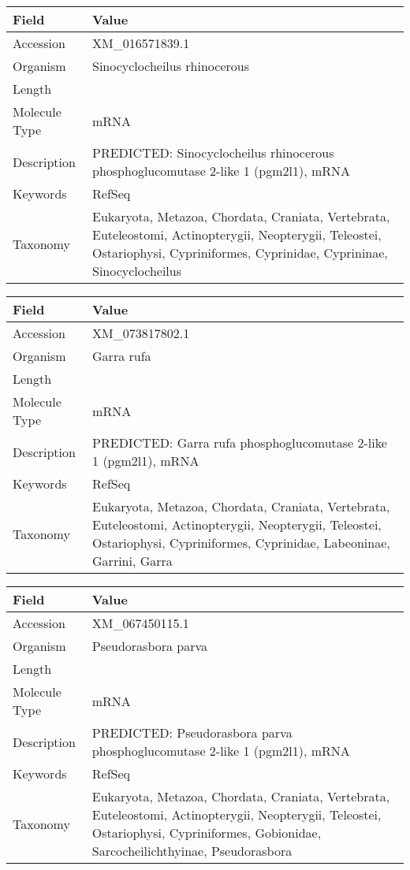 \documentclass[10pt]{article}
\begin{document}
\vspace{1em}
{\footnotesize
\begin{longtable}{>{\raggedright\arraybackslash}p{4.5cm} >{\raggedright\arraybackslash}p{11.5cm}}
\textbf{Field} & \textbf{Value} \\
\hline
Accession & XM\_016571839.1 \\
Organism & Sinocyclocheilus rhinocerous \\
Length & 3976 \\
Molecule Type & mRNA \\
Description & PREDICTED: Sinocyclocheilus rhinocerous phosphoglucomutase 2-like 1 (pgm2l1), mRNA \\
Keywords & RefSeq \\
Taxonomy & Eukaryota, Metazoa, Chordata, Craniata, Vertebrata, Euteleostomi, Actinopterygii, Neopterygii, Teleostei, Ostariophysi, Cypriniformes, Cyprinidae, Cyprininae, Sinocyclocheilus \\
\end{longtable}
}

\vspace{1em}
{\footnotesize
\begin{longtable}{>{\raggedright\arraybackslash}p{4.5cm} >{\raggedright\arraybackslash}p{11.5cm}}
\textbf{Field} & \textbf{Value} \\
\hline
Accession & XM\_073817802.1 \\
Organism & Garra rufa \\
Length & 3057 \\
Molecule Type & mRNA \\
Description & PREDICTED: Garra rufa phosphoglucomutase 2-like 1 (pgm2l1), mRNA \\
Keywords & RefSeq \\
Taxonomy & Eukaryota, Metazoa, Chordata, Craniata, Vertebrata, Euteleostomi, Actinopterygii, Neopterygii, Teleostei, Ostariophysi, Cypriniformes, Cyprinidae, Labeoninae, Garrini, Garra \\
\end{longtable}
}

\vspace{1em}
{\footnotesize
\begin{longtable}{>{\raggedright\arraybackslash}p{4.5cm} >{\raggedright\arraybackslash}p{11.5cm}}
\textbf{Field} & \textbf{Value} \\
\hline
Accession & XM\_067450115.1 \\
Organism & Pseudorasbora parva \\
Length & 3097 \\
Molecule Type & mRNA \\
Description & PREDICTED: Pseudorasbora parva phosphoglucomutase 2-like 1 (pgm2l1), mRNA \\
Keywords & RefSeq \\
Taxonomy & Eukaryota, Metazoa, Chordata, Craniata, Vertebrata, Euteleostomi, Actinopterygii, Neopterygii, Teleostei, Ostariophysi, Cypriniformes, Gobionidae, Sarcocheilichthyinae, Pseudorasbora \\
\end{longtable}
}
\end{document}
